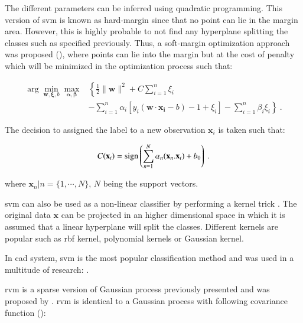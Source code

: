 \begin{enumerate}[leftmargin=*]
The different parameters can be inferred using quadratic programming. This version of \ac{svm} is known as hard-margin since that no point can lie in the margin area. However, this is highly probable to not find any hyperplane splitting the classes such as specified previously. Thus, a soft-margin optimization approach was proposed (\cite{Cortes1995}), where points can lie into the margin but at the cost of penalty which will be minimized in the optimization process such that:

\begin{equation}
\begin{aligned}
\arg\min_{\mathbf{w},\mathbf{\xi}, b } \max_{\boldsymbol{\alpha},\boldsymbol{\beta} } & \left\{ \frac{1}{2}\|\mathbf{w}\|^2+C \sum_{i=1}^n \xi_i \right. \\
 & \left. - \sum_{i=1}^{n}{\alpha_i[y_i(\mathbf{w}\cdot \mathbf{x_i} - b) -1 + \xi_i]} - \sum_{i=1}^{n} \beta_i \xi_i \right\} \ .
\end{aligned}
\end{equation}

The decision to assigned the label to a new observation $\mathbf{x}_i$ is taken such that:

\begin{equation}
	C(\mathbf{x}_i) = \operatorname*{sign} \left( \sum_{n=1}^{N} \alpha_n (\mathbf{x}_n . \mathbf{x}_i) + b_0 \right) \ .
	\label{eq:svmdec} 
\end{equation}

\noindent where $\mathbf{x}_n|n=\{1,\cdots,N\}$, $N$ being the support vectors.

\ac{svm} can also be used as a non-linear classifier by performing a kernel trick \cite{Boser1992}. The original data $\mathbf{x}$ can be projected in an higher dimensional space in which it is assumed that a linear hyperplane will split the classes. Different kernels are popular such as \ac{rbf} kernel, polynomial kernels or Gaussian kernel.

In \ac{cad} system, \ac{svm} is the most popular classification method and was used in a multitude of research: \cite{Artan2009,Artan2010,Chan2003,Kelm2007,Litjens2011,Litjens2012,Liu2013,Lopes2011,Niaf2011,Niaf2012,Ozer2009,Ozer2010,Parfait2012,Peng2013,Sung2011,Tiwari2012,Vos2008,Vos2008a,Vos2010,Vos2012}.

\Acf{rvm} is a sparse version of Gaussian process previously presented and was proposed by \cite{Tipping2001}. \ac{rvm} is identical to a Gaussian process with following covariance function (\cite{Quinonero-Candela2002}):


\end{enumerate}

